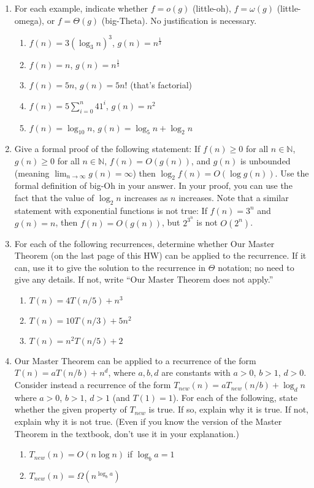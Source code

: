 \documentclass{article}
\begin{document}
\begin{enumerate}
    \item For each example, indicate whether $f = o(g)$ (little-oh), $f = \omega(g)$ (little-omega), or $f = \Theta(g)$ (big-Theta). No justification is necessary.
    \begin{enumerate}
        \item $f(n) = 3(\log_3 n)^3$, $g(n) = n^{\frac{1}{3}}$
        \item $f(n) = n$, $g(n) = n^{\frac{1}{3}}$
        \item $f(n) = 5n$, $g(n) = 5n!$ (that’s factorial)
        \item $f(n) = 5 \sum_{i=0}^n 41^i$, $g(n) = n^2$
        \item $f(n) = \log_{10} n$, $g(n) = \log_5 n + \log_2 n$
    \end{enumerate}

    \item Give a formal proof of the following statement: If $f(n) \geq 0$ for all $n \in \mathbb{N}$, $g(n) \geq 0$ for all $n \in \mathbb{N}$, $f(n) = O(g(n))$, and $g(n)$ is unbounded (meaning $\lim_{n\to\infty} g(n) = \infty$) then $\log_2 f(n) = O(\log g(n))$.
    Use the formal definition of big-Oh in your answer. In your proof, you can use the fact that the value of $\log_2 n$ increases as $n$ increases.
    Note that a similar statement with exponential functions is not true: If $f(n) = 3^n$ and $g(n) = n$, then $f(n) = O(g(n))$, but $2^{3^n}$ is not $O(2^n)$.

    \item For each of the following recurrences, determine whether Our Master Theorem (on the last page of this HW) can be applied to the recurrence. If it can, use it to give the solution to the recurrence in $\Theta$ notation; no need to give any details. If not, write “Our Master Theorem does not apply.”
    \begin{enumerate}
        \item $T(n) = 4T(n/5) + n^3$
        \item $T(n) = 10T(n/3) + 5n^2$
        \item $T(n) = n^2 T(n/5) + 2$
    \end{enumerate}

    \item Our Master Theorem can be applied to a recurrence of the form $T(n) = aT(n/b) + n^d$, where $a, b, d$ are constants with $a > 0$, $b > 1$, $d > 0$. Consider instead a recurrence of the form $T_{new}(n) = aT_{new}(n/b) + \log_d n$ where $a > 0$, $b > 1$, $d > 1$ (and $T(1) = 1$).
    For each of the following, state whether the given property of $T_{new}$ is true. If so, explain why it is true. If not, explain why it is not true. (Even if you know the version of the Master Theorem in the textbook, don’t use it in your explanation.)
    \begin{enumerate}
        \item $T_{new}(n) = O(n \log n)$ if $\log_b a = 1$
        \item $T_{new}(n) = \Omega(n^{\log_b a})$
    \end{enumerate}


\end{enumerate}
\end{document}
